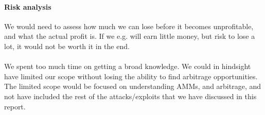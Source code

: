 \paragraph{Risk analysis} We would need to assess how much we can lose before it
becomes unprofitable, and what the actual profit is. If we e.g. will earn little
money, but risk to lose a lot, it would not be worth it in the end.\\\\
We spent too much time on getting a broad knowledge. We could in hindsight
have limited our scope without losing the ability to find arbitrage
opportunities. The limited scope would be focused on understanding AMMs, and
arbitrage, and not have included the rest of the attacks/exploits that we have
discussed in this report.
